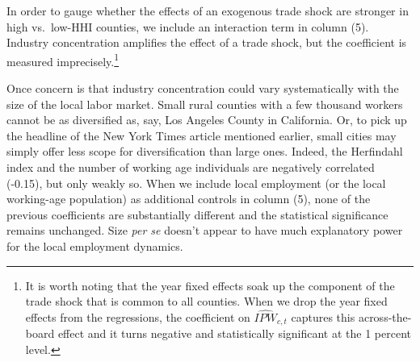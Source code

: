 \documentclass[onehalfspacing,11pt]{article}
\begin{document}
In order to gauge whether the effects of an exogenous trade shock are stronger in high vs.~low-HHI counties, we include an interaction term in column (5). Industry concentration amplifies the effect of a trade shock, but the coefficient is measured imprecisely.\footnote{It is worth noting that the year fixed effects soak up the component of the trade shock that is common to all counties. When we drop the year fixed effects from the regressions, the coefficient on $\widehat{IPW}_{c,t}$ captures this across-the-board effect and it turns negative and statistically significant at the 1 percent level.}

Once concern is that industry concentration could vary systematically with the size of the local labor market. Small rural counties with a few thousand workers cannot be as diversified as, say, Los Angeles County in California. Or, to pick up the headline of the New York Times article mentioned earlier, small cities may simply offer less scope for diversification than large ones. Indeed, the Herfindahl index and the number of working age individuals are negatively correlated (-0.15), but only weakly so. When we include local employment (or the local working-age population) as additional controls in column (5), none of the previous coefficients are substantially different and the statistical significance remains unchanged. Size {\it per se} doesn't appear to have much explanatory power for the local employment dynamics.
\end{document}
